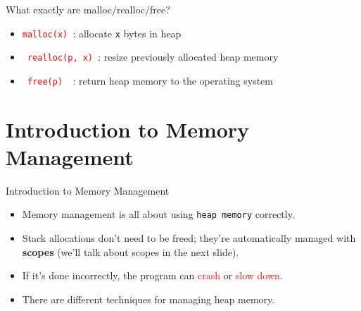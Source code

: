 \documentclass[
  10pt,
  ignorenonframetext,
]{beamer}
\newcommand{\passthrough}[1]{#1}
\providecommand{\tightlist}{%
  \setlength{\itemsep}{0pt}\setlength{\parskip}{0pt}}
\begin{document}
\begin{frame}[fragile]{What exactly are
malloc/realloc/free?}
\protect\hypertarget{what-exactly-are-mallocreallocfree}{}
\pause

\begin{itemize}
\tightlist
\item
  \texttt{\textcolor{red}{malloc(x)} }: allocate
  \passthrough{\lstinline!x!} bytes in heap
\end{itemize}

\pause

\begin{itemize}
\tightlist
\item
  \texttt{\textcolor{red}{ realloc(p, x) }}:
  resize previously allocated heap memory
\end{itemize}

\pause

\begin{itemize}
\tightlist
\item
  \texttt{\textcolor{red}{ free(p) } }: return
  heap memory to the operating system
\end{itemize}
\end{frame}

\hypertarget{introduction-to-memory-management}{%
\section{Introduction to Memory
Management}\label{introduction-to-memory-management}}

\begin{frame}{Introduction to Memory Management}
\pause

\begin{itemize}
\tightlist
\item
  Memory management is all about using
  \texttt{heap memory} correctly.
\end{itemize}

\pause

\begin{itemize}
\tightlist
\item
  Stack allocations don't need to be freed;
  they're automatically managed with
  \textbf{scopes} (we'll talk about scopes in the
  next slide).
\end{itemize}

\pause

\begin{itemize}
\tightlist
\item
  If it's done incorrectly, the program can
  \textcolor{red}{crash} or
  \textcolor{red}{slow down}.
\end{itemize}

\pause

\begin{itemize}
\tightlist
\item
  There are different techniques for managing heap
  memory.
\end{itemize}
\end{frame}
\end{document}
